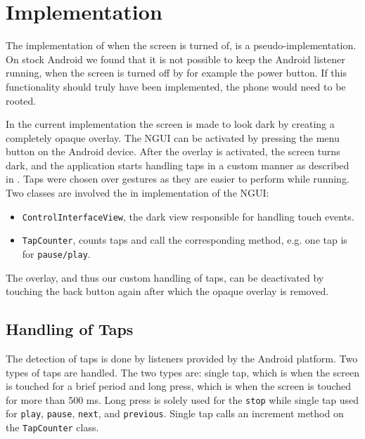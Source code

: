 \section{Implementation}
The implementation of when the screen is turned of, is a pseudo-implementation. On stock Android we found that it is not possible to keep the Android listener running, when the screen is turned off by for example the power button. If this functionality should truly have been implemented, the phone would need to be rooted. 

In the current implementation the screen is made to look dark by creating a completely opaque overlay. The NGUI can be activated by pressing the menu button on the Android device. After the overlay is activated, the screen turns dark, and the application starts handling taps in a custom manner as described in . Taps were chosen over gestures as they are easier to perform while running. Two classes are involved the in implementation of the NGUI: 
\begin{itemize}
\item \texttt{ControlInterfaceView}, the dark view responsible for handling touch events.
\item \texttt{TapCounter}, counts taps and call the corresponding method, e.g. one tap is for \texttt{pause/play}.
\end{itemize}


The overlay, and thus our custom handling of taps, can be deactivated by touching the back button again after which the opaque overlay is removed.

\subsection{Handling of Taps}\label{subsec:handleTaps}
The detection of taps is done by listeners provided by the Android platform. Two types of taps are handled. The two types are: single tap, which is when the screen is touched for a brief period and long press, which is when the screen is touched for more than 500 ms. Long press is solely used for the \texttt{stop} while single tap used for \texttt{play}, \texttt{pause}, \texttt{next}, and \texttt{previous}. Single tap calls an increment method on the \texttt{TapCounter} class.

